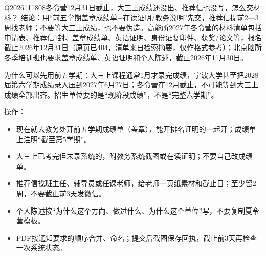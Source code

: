 \begin{qa}{Q2026111808}{冬令营12月31日截止，大三上成绩还没出、推荐信也没写，怎么交材料？}
结论：用“前五学期盖章成绩单+在读证明/教务说明”先交，推荐信提前2—3周找老师；不要等大三上成绩，也不要伪造。高能所2027年冬令营的材料清单包括申请表、推荐信1封、盖章成绩单、英语证明、身份证复印件、获奖/论文等，报名截止2026年12月31日（原页已404，清单来自检索摘要，仅作格式参考）；北京脑所冬季培训班也要求盖章成绩单、英语证明和个人陈述，截止2026年11月30日。

为什么可以先用前五学期：大三上课程通常1月才录完成绩，宁波大学甚至把2028届第六学期成绩录入压到2027年6月27日；冬令营在12月截止，不可能等到大三上成绩全部出齐。招生单位要的是“现阶段成绩”，不是“完整六学期”。

操作：

\begin{itemize}
\item 现在就去教务处开前五学期成绩单（盖章），能开排名证明的一起开；成绩单上注明“截至第5学期”。
\item 大三上已考完但未录系统的，附教务系统截图或在读证明；不要自己改成绩单。
\item 推荐信找班主任、辅导员或任课老师，给老师一页纸素材和截止日；至少留2周，不要截止前3天发微信。
\item 个人陈述按“为什么这个方向、做过什么、为什么这个单位”写，不要复制夏令营模板。
\item PDF按通知要求的顺序合并、命名；提交后截图保存回执，截止前3天再检查一次系统状态。
\end{itemize}
\end{qa}
